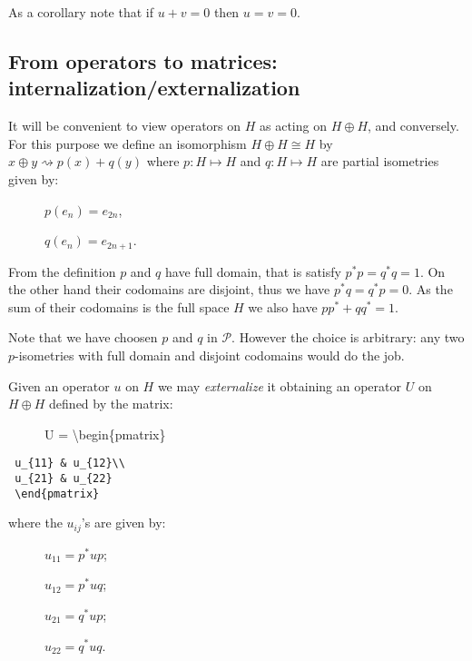 As a corollary note that if \(u+v=0\) then \(u=v=0\).


\subsection{From operators to matrices: internalization/externalization}\label{from-operators-to-matrices-internalizationexternalization}

It will be convenient to view operators on \(H\) as acting on
\(H\oplus H\), and conversely. For this purpose we define an isomorphism
\(H\oplus H \cong H\) by \(x\oplus y\rightsquigarrow p(x)+q(y)\) where
\(p:H\mapsto H\) and \(q:H\mapsto H\) are partial isometries given by:

\begin{description}
\item[]
\(p(e_n) = e_{2n}\),

\(q(e_n) = e_{2n+1}\).
\end{description}

From the definition \(p\) and \(q\) have full domain, that is satisfy
\(p^* p = q^* q = 1\). On the other hand their codomains are disjoint,
thus we have \(p^*q = q^*p = 0\). As the sum of their codomains is the
full space \(H\) we also have \(pp^* + qq^* = 1\).

Note that we have choosen \(p\) and \(q\) in \(\mathcal{P}\). However
the choice is arbitrary: any two \(p\)-isometries with full domain and
disjoint codomains would do the job.

Given an operator \(u\) on \(H\) we may \emph{externalize} it obtaining
an operator \(U\) on \(H\oplus H\) defined by the matrix:

\begin{description}
\item[]
U = \textbackslash{}begin\{pmatrix\}
\end{description}

\texttt{~u\_\{11\}~\&~u\_\{12\}\textbackslash{}\textbackslash{}}\\
\texttt{~u\_\{21\}~\&~u\_\{22\}}\\
\texttt{~\textbackslash{}end\{pmatrix\}}

where the \(u_{ij}\)'s are given by:

\begin{description}
\item[]
\(u_{11} = p^*up\);

\(u_{12} = p^*uq\);

\(u_{21} = q^*up\);

\(u_{22} = q^*uq\).
\end{description}

